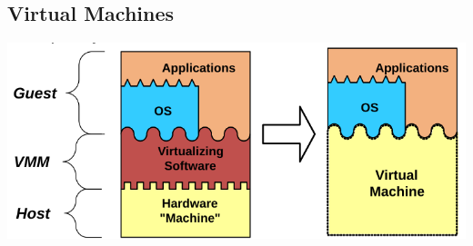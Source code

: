 \documentclass{scrartcl}
\begin{document}
\subsection{Virtual Machines}

\includegraphics[width=.8\textwidth]{figures/VirtualMachines.png}
\end{document}
